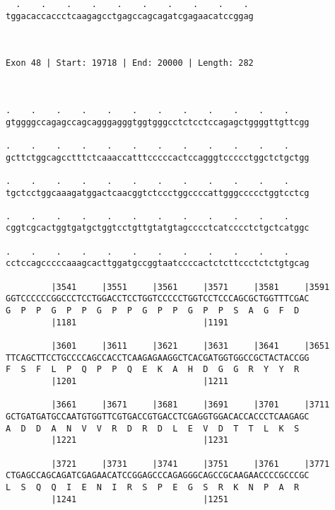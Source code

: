 \documentclass{article}
\begin{document}
\begin{Verbatim}
  .    .    .    .    .    .    .    .    .    . 
tggacaccaccctcaagagcctgagccagcagatcgagaacatccggag
                                                 
                                                 
 
Exon 48 | Start: 19718 | End: 20000 | Length: 282



.    .    .    .    .    .    .    .    .    .    .    .    
gtggggccagagccagcagggagggtggtgggcctctcctccagagctggggttgttcgg
                                                            
.    .    .    .    .    .    .    .    .    .    .    .    
gcttctggcagcctttctcaaaccatttcccccactccagggtccccctggctctgctgg
                                                            
.    .    .    .    .    .    .    .    .    .    .    .    
tgctcctggcaaagatggactcaacggtctccctggccccattgggccccctggtcctcg
                                                            
.    .    .    .    .    .    .    .    .    .    .    .    
cggtcgcactggtgatgctggtcctgttgtatgtagcccctcatcccctctgctcatggc
                                                            
.    .    .    .    .    .    .    .    .    .    .    .    
cctccagcccccaaagcacttggatgccggtaatccccactctcttccctctctgtgcag
                                                            
         |3541     |3551     |3561     |3571     |3581     |3591
GGTCCCCCCGGCCCTCCTGGACCTCCTGGTCCCCCTGGTCCTCCCAGCGCTGGTTTCGAC
G  P  P  G  P  P  G  P  P  G  P  P  G  P  P  S  A  G  F  D  
         |1181                         |1191                
  
         |3601     |3611     |3621     |3631     |3641     |3651
TTCAGCTTCCTGCCCCAGCCACCTCAAGAGAAGGCTCACGATGGTGGCCGCTACTACCGG
F  S  F  L  P  Q  P  P  Q  E  K  A  H  D  G  G  R  Y  Y  R  
         |1201                         |1211                
  
         |3661     |3671     |3681     |3691     |3701     |3711
GCTGATGATGCCAATGTGGTTCGTGACCGTGACCTCGAGGTGGACACCACCCTCAAGAGC
A  D  D  A  N  V  V  R  D  R  D  L  E  V  D  T  T  L  K  S  
         |1221                         |1231                
  
         |3721     |3731     |3741     |3751     |3761     |3771
CTGAGCCAGCAGATCGAGAACATCCGGAGCCCAGAGGGCAGCCGCAAGAACCCCGCCCGC
L  S  Q  Q  I  E  N  I  R  S  P  E  G  S  R  K  N  P  A  R  
         |1241                         |1251                
  

\end{Verbatim}
\end{document}
